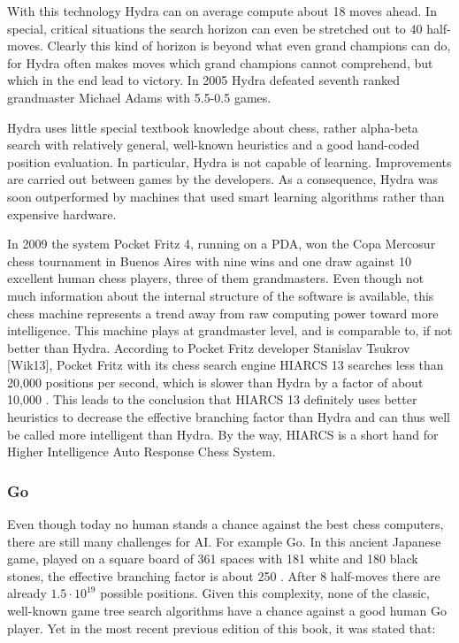 \documentclass[10pt]{article}
\begin{document}
With this technology Hydra can on average compute about 18 moves ahead. In special, critical situations the search horizon can even be stretched out to 40 half-moves. Clearly this kind of horizon is beyond what even grand champions can do, for Hydra often makes moves which grand champions cannot comprehend, but which in the end lead to victory. In 2005 Hydra defeated seventh ranked grandmaster Michael Adams with 5.5-0.5 games.

Hydra uses little special textbook knowledge about chess, rather alpha-beta search with relatively general, well-known heuristics and a good hand-coded\\
position evaluation. In particular, Hydra is not capable of learning. Improvements are carried out between games by the developers. As a consequence, Hydra was soon outperformed by machines that used smart learning algorithms rather than expensive hardware.

In 2009 the system Pocket Fritz 4, running on a PDA, won the Copa Mercosur chess tournament in Buenos Aires with nine wins and one draw against 10 excellent human chess players, three of them grandmasters. Even though not much information about the internal structure of the software is available, this chess machine represents a trend away from raw computing power toward more intelligence. This machine plays at grandmaster level, and is comparable to, if not better than Hydra. According to Pocket Fritz developer Stanislav Tsukrov [Wik13], Pocket Fritz with its chess search engine HIARCS 13 searches less than 20,000 positions per second, which is slower than Hydra by a factor of about 10,000 . This leads to the conclusion that HIARCS 13 definitely uses better heuristics to decrease the effective branching factor than Hydra and can thus well be called more intelligent than Hydra. By the way, HIARCS is a short hand for Higher Intelligence Auto Response Chess System.

\subsubsection*{Go}
Even though today no human stands a chance against the best chess computers, there are still many challenges for AI. For example Go. In this ancient Japanese game, played on a square board of 361 spaces with 181 white and 180 black stones, the effective branching factor is about 250 . After 8 half-moves there are already $1.5 \cdot 10^{19}$ possible positions. Given this complexity, none of the classic, well-known game tree search algorithms have a chance against a good human Go player. Yet in the most recent previous edition of this book, it was stated that:
\end{document}
